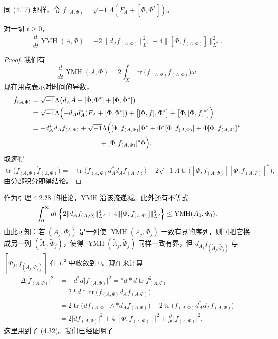 同 (4.17) 那样，令 $f_{(A,\Phi)}=\sqrt{-1}\Lambda(F_A+[\Phi,\Phi^*])$。

\begin{lemma}
对一切 $t\ge0$，
\[
\frac{d}{dt}\operatorname{YMH}(A,\Phi)
=-2\|d_Af_{(A,\Phi)}\|^2_{L^2}-4\|[\Phi,f_{(A,\Phi)}]\|^2_{L^2}.
\]
\end{lemma}

\begin{proof}
我们有
\[
\frac{d}{dt}\operatorname{YMH}(A,\Phi)=2\int_X\operatorname{tr}\bigl(f_{(A,\Phi)}\dot f_{(A,\Phi)}\bigr)\omega.
\]
现在用点表示对时间的导数，
\[
\begin{aligned}
\dot f_{(A,\Phi)}
&=\sqrt{-1}\Lambda\bigl(d_A\dot A+[\dot\Phi,\Phi^*]+[\Phi,\dot\Phi^*]\bigr)\\
&=\sqrt{-1}\Lambda\Bigl(-d_Ad_A^*(F_A+[\Phi,\Phi^*])+\bigl[[\Phi,f],\Phi^*\bigr]+\bigl[\Phi,[\Phi,f]^*\bigr]\Bigr)\\
&=-d_A^*d_Af_{(A,\Phi)}+\sqrt{-1}\Lambda\Bigl([\Phi,f_{(A,\Phi)}]\Phi^*+\Phi^*[\Phi,f_{(A,\Phi)}]+\Phi[\Phi,f_{(A,\Phi)}]^*\\
&\qquad\qquad\qquad\qquad\qquad+[\Phi,f_{(A,\Phi)}]^*\Phi\Bigr).
\end{aligned}
\]
取迹得
\begin{equation}
\operatorname{tr}\bigl(f_{(A,\Phi)}\dot f_{(A,\Phi)}\bigr)
=-\operatorname{tr}\bigl(f_{(A,\Phi)}d_A^*d_Af_{(A,\Phi)}\bigr)
-2\sqrt{-1}\Lambda\operatorname{tr}\bigl([\Phi,f_{(A,\Phi)}][\Phi,f_{(A,\Phi)}]^*\bigr),
\label{eq:4.32}\tag{4.32}
\end{equation}
由分部积分即得结论。
\end{proof}

作为引理 4.2.28 的推论，YMH 沿该流递减。此外还有不等式
\[
\int_0^\infty dt\,\Bigl\{2\|d_Af_{(A,\Phi)}\|^2_{L^2}+4\|[\Phi,f_{(A,\Phi)}]\|^2_{L^2}\Bigr\}
\le\operatorname{YMH}(A_0,\Phi_0).
\]
由此可知：若 $(A_j,\Phi_j)$ 是一列使 $\operatorname{YMH}(A_j,\Phi_j)$ 一致有界的序列，则可把它换成另一列 $(\tilde A_j,\tilde\Phi_j)$，使得 $\operatorname{YMH}(\tilde A_j,\tilde\Phi_j)$ 同样一致有界，但 $d_{A_j}f_{(\tilde A_j,\tilde\Phi_j)}$ 与 $[\Phi_j,f_{(\tilde A_j,\tilde\Phi_j)}]$ 在 $L^2$ 中收敛到 $0$。现在来计算
\[
\begin{aligned}
\Delta\bigl|f_{(A,\Phi)}\bigr|^2
&=-d^*d\bigl|f_{(A,\Phi)}\bigr|^2
=*d*d\operatorname{tr}f_{(A,\Phi)}^2\\
&=2*d*\operatorname{tr}\bigl(f_{(A,\Phi)}d_Af_{(A,\Phi)}\bigr)\\
&=2\operatorname{tr}\bigl(df_{(A,\Phi)}\wedge *d_Af_{(A,\Phi)}\bigr)
-2\operatorname{tr}\bigl(f_{(A,\Phi)}d_A^*d_Af_{(A,\Phi)}\bigr)\\
&=2\bigl|df_{(A,\Phi)}\bigr|^2+4\bigl|[\Phi,f_{(A,\Phi)}]\bigr|^2
+\frac{\partial}{\partial t}\bigl|f_{(A,\Phi)}\bigr|^2,
\end{aligned}
\]
这里用到了 (4.32)。我们已经证明了


